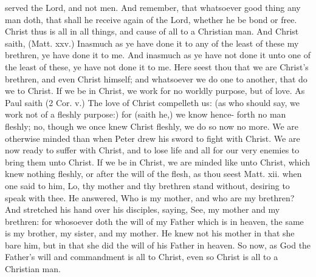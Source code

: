 served the Lord, and not men. And remember, that 
whatsoever good thing any man doth, that shall he receive 
again of the Lord, whether he be bond or free. Christ 
thus is all in all things, and cause of all to a Christian man. 
And Christ saith, (Matt. xxv.) Inasmuch as ye have done 
it to any of the least of these my brethren, ye have done 
it to me. And inasmuch as ye have not done it unto one 
of the least of these, ye have not done it to me. Here 
seest thou that we are Christ's brethren, and even Christ 
himself; and whatsoever we do one to another, that do we 
to Christ. If we be in Christ, we work for no worldly 
purpose, but of love. As Paul saith (2 Cor. v.) The love 
of Christ compelleth us: (as who should say, we work 
not of a fleshly purpose:) for (saith he,) we know hence- 
forth no man fleshly; no, though we once knew Christ 
fleshly, we do so now no more. We are otherwise minded 
than when Peter drew his sword to fight with Christ. We 
are now ready to suffer with Christ, and to lose life and 
all for our very enemies to bring them unto Christ. If we 
be in Christ, we are minded like unto Christ, which knew 
nothing fleshly, or after the will of the flesh, as thou seest 
Matt. xii. when one said to him, Lo, thy mother and thy 
brethren stand without, desiring to speak with thee. He 
answered, Who is my mother, and who are my brethren? 
And stretched his hand over his disciples, saying, See, my 
mother and my brethren: for whosoever doth the will of 
my Father which is in heaven, the same is my brother, my 
sister, and my mother. He knew not his mother in that 
she bare him, but in that she did the will of his Father in 
heaven. So now, as God the Father's will and commandment
is all to Christ, even so Christ is all to a 
Christian man. 

